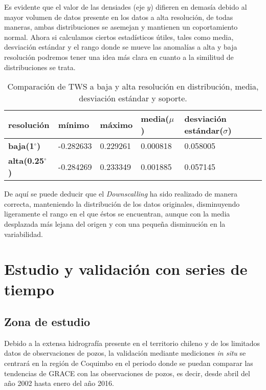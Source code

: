 Es evidente que el valor de las densiades (eje $y$) difieren en demasía debido al mayor volumen de datos presente en los datos a alta resolución, de todas maneras, ambas distribuciones
se asemejan y mantienen un coportamiento normal. Ahora si calculamos ciertos estadísticos útiles, tales como media, desviación estándar y el rango donde se mueve las anomalías a alta y baja resolución podremos tener una idea más clara 
en cuanto a la similitud de distribuciones se trata.

\begin{table}[H] 
    \caption[Comparación de distribuciones de TWS a baja y alta resolución]{Comparación de TWS a baja y alta resolución en distribución, media, desviación estándar y soporte.}
    \begin{tabularx}{0.9\textwidth}{CCCCC}
    \toprule
    \textbf{resolución}	& \textbf{mínimo}	& \textbf{máximo} & \textbf{media($\mu$)} & \textbf{desviación estándar($\sigma$)}\\
        \midrule
        \textbf{baja(1$^{\circ}$)}		& -0.282633 & 0.229261  & 0.000818 & 0.058005\\
        \textbf{alta(0.25$^{\circ}$)}   & -0.284269 & 0.233349	& 0.001885 & 0.057145\\
        \bottomrule
    \end{tabularx}
\end{table}

De aquí se puede deducir que el \textit{Downscalling} ha sido realizado de manera correcta, manteniendo la distribución de los datos originales, disminuyendo ligeramente el rango en el que éstos se encuentran,
aunque con la media desplazada más lejana del origen y con una pequeña disminución en la variabilidad.


%
%
%
%


\section{Estudio y validación con series de tiempo}

\subsection{Zona de estudio}

Debido a la extensa hidrografía presente en el territorio chileno y de los limitados datos de observaciones de pozos, la validación mediante mediciones \textit{in situ} se centrará
en la región de Coquimbo en el periodo donde se puedan comparar las tendencias de GRACE con las observaciones de pozos, es decir, desde abril del año 2002 hasta enero del año 2016. 

